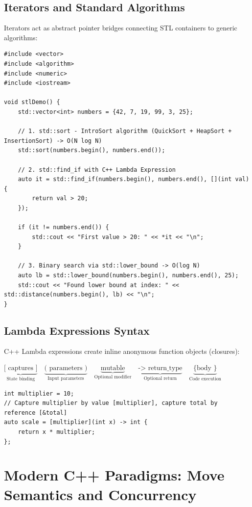 \documentclass[10pt,journal,compsoc,onecolumn]{IEEEtran}
\begin{document}
\subsection{Iterators and Standard Algorithms}
Iterators act as abstract pointer bridges connecting STL containers to generic algorithms:

\begin{verbatim}
#include <vector>
#include <algorithm>
#include <numeric>
#include <iostream>

void stlDemo() {
    std::vector<int> numbers = {42, 7, 19, 99, 3, 25};

    // 1. std::sort - IntroSort algorithm (QuickSort + HeapSort + InsertionSort) -> O(N log N)
    std::sort(numbers.begin(), numbers.end());

    // 2. std::find_if with C++ Lambda Expression
    auto it = std::find_if(numbers.begin(), numbers.end(), [](int val) {
        return val > 20;
    });

    if (it != numbers.end()) {
        std::cout << "First value > 20: " << *it << "\n";
    }

    // 3. Binary search via std::lower_bound -> O(log N)
    auto lb = std::lower_bound(numbers.begin(), numbers.end(), 25);
    std::cout << "Found lower bound at index: " << std::distance(numbers.begin(), lb) << "\n";
}
\end{verbatim}

\subsection{Lambda Expressions Syntax}
C++ Lambda expressions create inline anonymous function objects (closures):

$\underbrace{\text{[ captures ]}}_{\text{State binding}} \quad \underbrace{\text{( parameters )}}_{\text{Input parameters}} \quad \underbrace{\text{mutable}}_{\text{Optional modifier}} \quad \underbrace{\text{-> return\_type}}_{\text{Optional return}} \quad \underbrace{\text{\{ body \}}}_{\text{Code execution}}$

\begin{verbatim}
int multiplier = 10;
// Capture multiplier by value [multiplier], capture total by reference [&total]
auto scale = [multiplier](int x) -> int {
    return x * multiplier;
};
\end{verbatim}

\section{Modern C++ Paradigms: Move Semantics and Concurrency}
\label{sec:modern}
\end{document}
